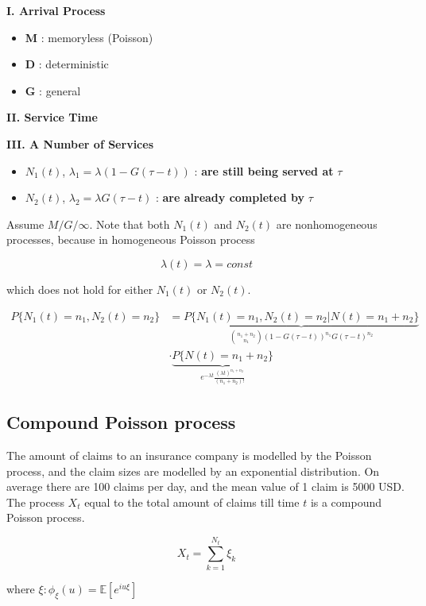 \documentclass[12pt]{article}
\theoremstyle{nonumberbreak}
\begin{document}
\textbf{I. Arrival Process}

\begin{itemize}
	\item \textbf{M} : memoryless (Poisson)
	\item \textbf{D} : deterministic
	\item \textbf{G} : general
\end{itemize}


\textbf{II. Service Time}

\textbf{III. A Number of Services}


\begin{itemize}
	\item $N_1(t)$, $\lambda_1 = \lambda (1 - G(\tau - t) )$ : \textbf{are still being served at} $\tau$
	\item $N_2(t)$, $\lambda_2 = \lambda G(\tau - t)$ : \textbf{are already completed by} $\tau$
\end{itemize}



Assume $M/G/\infty$. Note that both $N_1(t)$ and $N_2(t)$ are nonhomogeneous processes, because in homogeneous Poisson process

$$
\lambda(t) = \lambda = const
$$

which does not hold for either $N_1(t)$ or $N_2(t)$. 

$$
\begin{aligned}
P\{ N_1(t) = n_1,  N_2(t) = n_2 \} &= \underbrace{P\{ N_1(t) = n_1,  N_2(t) = n_2 | N(t) = n_1 + n_2 \}}_{\binom{n_1+n_2}{n_1} (1 - G(\tau -t))^{n_1} G(\tau -t)^{n_2} } \\[8pt]
&\cdot \underbrace{P\{ N(t) = n_1 + n_2 \}}_{e^{-\lambda t} \frac{(\lambda t)^{n_1 + n_2}}{(n_1+n_2)!}}
\end{aligned}
$$


\subsection{Compound Poisson process}

The amount of claims to an insurance company is modelled by the Poisson process, and the claim sizes are modelled by an exponential distribution. On average there are 100 claims per day, and the mean value of 1 claim is 5000 USD. The process $X_t$ equal to the total amount of claims till time $t$ is a compound Poisson process. 


$$
X_t = \sum_{k=1}^{N_t} \xi_k
$$

where $\xi: \phi_\xi (u) = \mathbb{E} [e^{iu\xi} ]$
\end{document}

